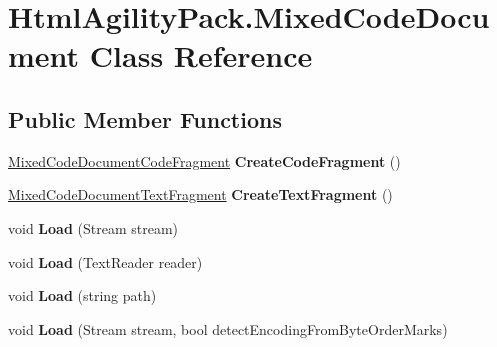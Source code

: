 \hypertarget{class_html_agility_pack_1_1_mixed_code_document}{}\section{Html\+Agility\+Pack.\+Mixed\+Code\+Document Class Reference}
\label{class_html_agility_pack_1_1_mixed_code_document}
\subsection*{Public Member Functions}
\begin{DoxyCompactItemize}
\item 
\mbox{\label{class_html_agility_pack_1_1_mixed_code_document_a269d7c74831b0b5191a6211eedaa163f}} 
\hyperlink{class_html_agility_pack_1_1_mixed_code_document_code_fragment}{Mixed\+Code\+Document\+Code\+Fragment} {\bfseries Create\+Code\+Fragment} ()
\item 
\mbox{\label{class_html_agility_pack_1_1_mixed_code_document_ae20ea4c1e8d8fabdf255052e499d000c}} 
\hyperlink{class_html_agility_pack_1_1_mixed_code_document_text_fragment}{Mixed\+Code\+Document\+Text\+Fragment} {\bfseries Create\+Text\+Fragment} ()
\item 
\mbox{\label{class_html_agility_pack_1_1_mixed_code_document_a216b550a01ccd715a8e4fec262309051}} 
void {\bfseries Load} (Stream stream)
\item 
\mbox{\label{class_html_agility_pack_1_1_mixed_code_document_a3b181063594cb5f78176831d658b646b}} 
void {\bfseries Load} (Text\+Reader reader)
\item 
\mbox{\label{class_html_agility_pack_1_1_mixed_code_document_ac8ff0c1ee31286ee2dd875dd994a600f}} 
void {\bfseries Load} (string path)
\item 
\mbox{\label{class_html_agility_pack_1_1_mixed_code_document_a46f1ad69cccbcb03a86533948a240e67}} 
void {\bfseries Load} (Stream stream, bool detect\+Encoding\+From\+Byte\+Order\+Marks)

\end{DoxyCompactItemize}
